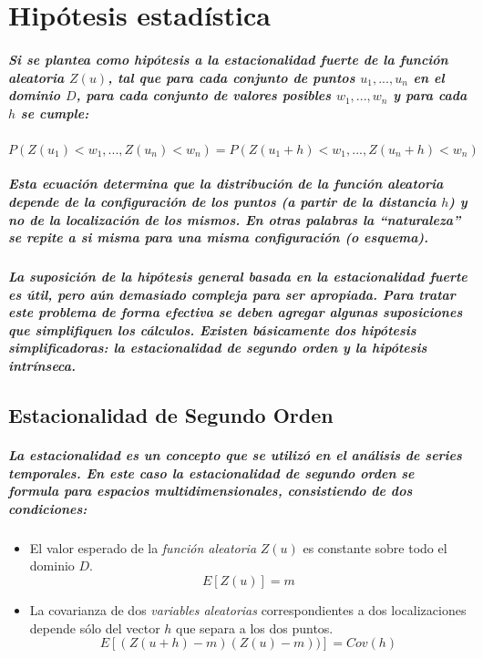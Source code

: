 \chapter{Hipótesis estadística}
\paragraph{
Si se plantea como hipótesis a la \emph{estacionalidad fuerte} de la \emph{función aleatoria} $Z(u)$, tal que para cada conjunto de puntos $u_1,...,u_n$ en el dominio $D$, para cada conjunto de valores posibles $w_1,...,w_n$ y para cada $h$ se cumple:
}
\begin{equation}
P(Z(u_1) < w_1,...,Z(u_n) < w_n) = P(Z(u_1+h) < w_1,...,Z(u_n+h) < w_n)
\end{equation}
\paragraph{
Esta ecuación determina que la distribución de la función aleatoria depende de la configuración de los puntos (a partir de la distancia $h$) y no de la localización de los mismos. En otras palabras la ``naturaleza'' se repite a si misma para una misma configuración (o esquema).
}
\paragraph{
La suposición de la \emph{hipótesis general} basada en la \emph{estacionalidad fuerte} es útil, pero aún demasiado compleja para ser apropiada. Para tratar este problema de forma efectiva se deben agregar algunas suposiciones que simplifiquen los cálculos. Existen básicamente dos hipótesis simplificadoras: la \emph{estacionalidad de segundo orden} y la \emph{hipótesis intrínseca}.
}



\section{Estacionalidad de Segundo Orden}
\paragraph{
La estacionalidad es un concepto que se utilizó en el análisis de series temporales. En este caso la \emph{estacionalidad de segundo orden} se formula para espacios multidimensionales, consistiendo de dos condiciones:
}
\begin{itemize}
\item El valor esperado de la \emph{función aleatoria} $Z(u)$ es constante sobre todo el dominio $D$.
\begin{equation}
E[Z(u)] = m
\end{equation}
\item La covarianza de dos \emph{variables aleatorias} correspondientes a dos localizaciones depende sólo del vector $h$ que separa a los dos puntos.
\begin{equation}
E[(Z(u+h)-m)(Z(u)-m))] = Cov(h)
\label{eq:Covarianza}
\end{equation}
\end{itemize}
